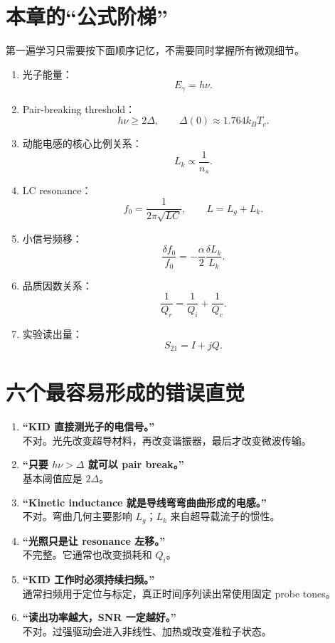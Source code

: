 \documentclass[11pt,a4paper,openany]{ctexrep}
\begin{document}
\section{本章的“公式阶梯”}
第一遍学习只需要按下面顺序记忆，不需要同时掌握所有微观细节。

\begin{enumerate}
  \item 光子能量：
  \[
  E_\gamma=h\nu.
  \]
  \item Pair-breaking threshold：
  \[
  h\nu\ge2\Delta,
  \qquad
  \Delta(0)\approx1.764k_BT_c.
  \]
  \item 动能电感的核心比例关系：
  \[
  L_k\propto\frac1{n_s}.
  \]
  \item LC resonance：
  \[
  f_0=\frac1{2\pi\sqrt{LC}},\qquad L=L_g+L_k.
  \]
  \item 小信号频移：
  \[
  \frac{\delta f_0}{f_0}=-\frac{\alpha}{2}\frac{\delta L_k}{L_k}.
  \]
  \item 品质因数关系：
  \[
  \frac1{Q_r}=\frac1{Q_i}+\frac1{Q_c}.
  \]
  \item 实验读出量：
  \[
  S_{21}=I+jQ.
  \]
\end{enumerate}

\section{六个最容易形成的错误直觉}
\begin{enumerate}
  \item \textbf{“KID 直接测光子的电信号。”}\\
  不对。光先改变超导材料，再改变谐振器，最后才改变微波传输。
  \item \textbf{“只要 $h\nu>\Delta$ 就可以 pair break。”}\\
  基本阈值应是 $2\Delta$。
  \item \textbf{“Kinetic inductance 就是导线弯弯曲曲形成的电感。”}\\
  不对。弯曲几何主要影响 $L_g$；$L_k$ 来自超导载流子的惯性。
  \item \textbf{“光照只是让 resonance 左移。”}\\
  不完整。它通常也改变损耗和 $Q_i$。
  \item \textbf{“KID 工作时必须持续扫频。”}\\
  通常扫频用于定位与标定，真正时间序列读出常使用固定 probe tones。
  \item \textbf{“读出功率越大，SNR 一定越好。”}\\
  不对。过强驱动会进入非线性、加热或改变准粒子状态。
\end{enumerate}
\end{document}
